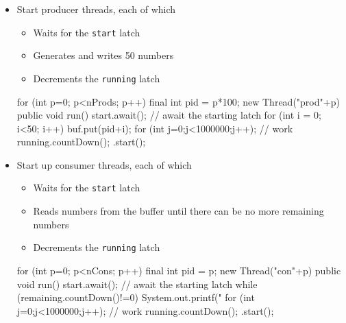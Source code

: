 \documentclass{concdistfoils}
\begin{document}
\begin{slide}
\begin{itemize}
\item Start producer threads, each of which
\begin{itemize}
\item Waits for the  \texttt{start} latch
\item Generates and writes 50 numbers
\item Decrements the \texttt{running} latch
\end{itemize}
\vfill
\begin{class}{}    
    for (int p=0; p<nProds; p++) 
    { final int pid = p*100;
      new Thread("prod"+p)
      { public void run()
        { start.await();                 // await the starting latch        
          for (int i = 0; i<50; i++)
          { buf.put(pid+i); 
            for (int j=0;j<1000000;j++); // work
          } 
          running.countDown();
        }
      }.start();
    }
\end{class}
\end{itemize}
\end{slide}

\begin{slide}
\begin{itemize}
\item Start up consumer threads, each of which
\begin{itemize}
\item Waits for the  \texttt{start} latch
\item Reads numbers from the buffer until there can be no more remaining numbers
\item Decrements the \texttt{running} latch
\end{itemize}
\vfill
\begin{class}{}
    for (int p=0; p<nCons; p++) 
    { final int pid = p;
      new Thread("con"+p)
      { public void run()
        { start.await();                    // await the starting latch
          while (remaining.countDown()!=0) 
          {  System.out.printf("%
             for (int j=0;j<1000000;j++);  // work
          }
          running.countDown();
        }
      }.start();
    }
\end{class}
\end{itemize}
\end{slide}
\end{document}
